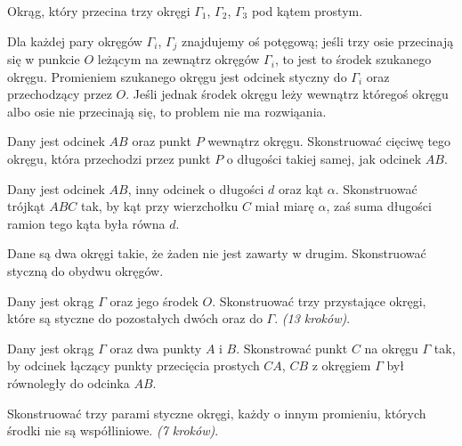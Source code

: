 \begin{problem}[Monge'a?]
    Okrąg, który przecina trzy okręgi $\Gamma_1$, $\Gamma_2$, $\Gamma_3$ pod kątem prostym.
\end{problem}

Dla każdej pary okręgów $\Gamma_i$, $\Gamma_j$ znajdujemy oś potęgową; jeśli trzy osie przecinają się w punkcie $O$ leżącym na zewnątrz okręgów $\Gamma_i$, to jest to środek szukanego okręgu.
Promieniem szukanego okręgu jest odcinek styczny do $\Gamma_i$ oraz przechodzący przez $O$.
Jeśli jednak środek okręgu leży wewnątrz któregoś okręgu albo osie nie przecinają się, to problem nie ma rozwiąania.

\begin{problem}
    Dany jest odcinek $AB$ oraz punkt $P$ wewnątrz okręgu.
    Skonstruować cięciwę tego okręgu, która przechodzi przez punkt $P$ o długości takiej samej, jak odcinek $AB$.
\end{problem}

\begin{problem}
    Dany jest odcinek $AB$, inny odcinek o długości $d$ oraz kąt $\alpha$.
    Skonstruować trójkąt $ABC$ tak, by kąt przy wierzchołku $C$ miał miarę $\alpha$, zaś suma długości ramion tego kąta była równa $d$.
\end{problem}

\begin{problem}
    Dane są dwa okręgi takie, że żaden nie jest zawarty w drugim.
    Skonstruować styczną do obydwu okręgów.
\end{problem}

\begin{problem}
    Dany jest okrąg $\Gamma$ oraz jego środek $O$.
    Skonstruować trzy przystające okręgi, które są styczne do pozostałych dwóch oraz do $\Gamma$. \hfill \emph{(13 kroków)}. %
\end{problem}

\begin{problem}
    Dany jest okrąg $\Gamma$ oraz dwa punkty $A$ i $B$.
    Skonstrować punkt $C$ na okręgu $\Gamma$ tak, by odcinek łączący punkty przecięcia prostych $CA$, $CB$ z okręgiem $\Gamma$ był równoległy do odcinka $AB$.
\end{problem}

\begin{problem}
    Skonstruować trzy parami styczne okręgi, każdy o innym promieniu, których środki nie są współliniowe. \hfill \emph{(7 kroków)}. %
\end{problem}

